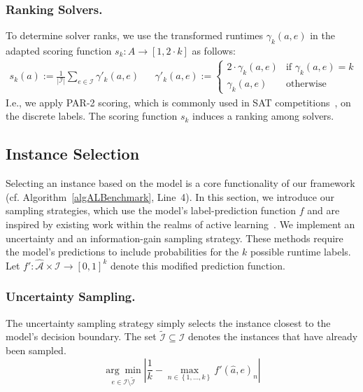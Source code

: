 \documentclass[runningheads]{llncs}
\begin{document}
\subsubsection{Ranking Solvers.}

To determine solver ranks, we use the transformed runtimes $\gamma_k(a, e)$ in the adapted scoring function $s_k : A \rightarrow [1, 2 \cdot k]$ as follows:
%
\begin{align}
  s_k(a) := \frac{1}{|\mathcal{I}|} \sum_{e \in \mathcal{I}} \gamma'_k(a, e)
  &&
  \gamma'_k(a, e) := \begin{cases}
    2 \cdot \gamma_k(a, e)   & \text{if } \gamma_k(a, e) = k\\
  \gamma_k(a, e)  & \text{otherwise}
  \end{cases}
  \label{eq:rankingeq}
\end{align}
%
I.e., we apply PAR-2 scoring, which is commonly used in SAT competitions~\cite{FroleyksHIJS21}, on the discrete labels.
The scoring function $s_k$ induces a ranking among solvers.


\subsection{Instance Selection}
\label{sec:main:selection}

Selecting an instance based on the model is a core functionality of our framework (cf. Algorithm~\ref{algALBenchmark}, Line~4).
In this section, we introduce our sampling strategies, which use the model's label-prediction function $f$ and are inspired by existing work within the realms of active learning~\cite{settles2009active}.
We implement an uncertainty and an information-gain sampling strategy.
These methods require the model's predictions to include probabilities for the $k$ possible runtime labels.
Let $f' : \mathcal{\hat A} \times \mathcal{I} \rightarrow \left[0, 1\right]^k$ denote this modified prediction function.

\subsubsection{Uncertainty Sampling.}

The uncertainty sampling strategy simply selects the instance closest to the model's decision boundary.
The set $\tilde{\mathcal{I}} \subseteq \mathcal{I}$ denotes the instances that have already been sampled.
%
\begin{equation*}
  \underset{e \in \mathcal{I} \setminus \tilde{\mathcal{I}}}{\arg\min} \left\lvert \frac{1}{k} - \max_{n \in \left\lbrace 1, \dots, k \right\rbrace} f'\!\left(\hat{a}, e\right)_{n} \right\rvert
\end{equation*}
\end{document}
